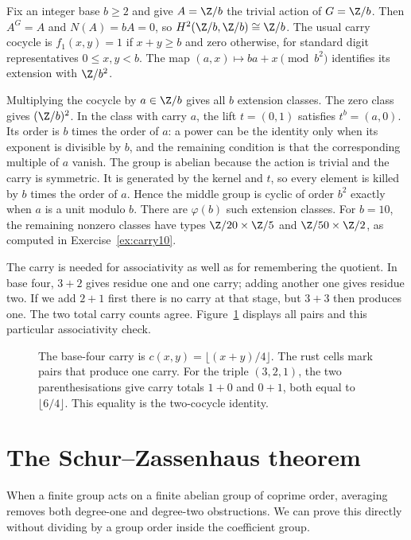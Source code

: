 \begin{example}[carrying]\label{ex:carry}
Fix an integer base $b\ge2$ and give $A=\Z/b$ the trivial action of $G=\Z/b$. Then $A^G=A$ and $N(A)=bA=0$, so
$H^2(\Z/b,\Z/b)\cong\Z/b$.
The usual carry cocycle is $f_1(x,y)=1$ if $x+y\ge b$ and zero otherwise, for standard digit representatives $0\le x,y<b$. The map
$(a,x)\mapsto ba+x\pmod{b^2}$ identifies its extension with $\Z/b^2$.

Multiplying the cocycle by $a\in\Z/b$ gives all $b$ extension classes. The zero class gives $(\Z/b)^2$. In the class with carry $a$, the lift $t=(0,1)$ satisfies $t^b=(a,0)$. Its order is $b$ times the order of $a$: a power can be the identity only when its exponent is divisible by $b$, and the remaining condition is that the corresponding multiple of $a$ vanish. The group is abelian because the action is trivial and the carry is symmetric. It is generated by the kernel and $t$, so every element is killed by $b$ times the order of $a$. Hence the middle group is cyclic of order $b^2$ exactly when $a$ is a unit modulo $b$. There are $\varphi(b)$ such extension classes. For $b=10$, the remaining nonzero classes have types $\Z/20\times\Z/5$ and $\Z/50\times\Z/2$, as computed in Exercise~\ref{ex:carry10}.
\end{example}

The carry is needed for associativity as well as for remembering the quotient. In base four, $3+2$ gives residue one and one carry; adding another one gives residue two. If we add $2+1$ first there is no carry at that stage, but $3+3$ then produces one. The two total carry counts agree. Figure~\ref{fig:v10new-ch08-carry} displays all pairs and this particular associativity check.

\begin{figure}[ht]
\centering
{}
\caption{The base-four carry is $c(x,y)=\lfloor(x+y)/4\rfloor$. The rust cells mark pairs that produce one carry. For the triple $(3,2,1)$, the two parenthesisations give carry totals $1+0$ and $0+1$, both equal to $\lfloor6/4\rfloor$. This equality is the two-cocycle identity.}
\label{fig:v10new-ch08-carry}
\end{figure}

\section{The Schur--Zassenhaus theorem}

When a finite group acts on a finite abelian group of coprime order, averaging removes both degree-one and degree-two obstructions. We can prove this directly without dividing by a group order inside the coefficient group.

